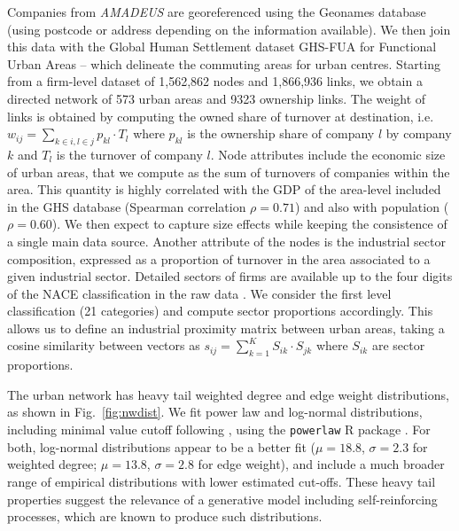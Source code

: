 \documentclass[10pt,letterpaper]{article}
\begin{document}
Companies from \emph{AMADEUS} are georeferenced using the Geonames database (using postcode or address depending on the information available). We then join this data with the Global Human Settlement dataset GHS-FUA for Functional Urban Areas \cite{Florczyk2019ghs} -- which delineate the commuting areas for urban centres. Starting from a firm-level dataset of 1,562,862 nodes and 1,866,936 links, we obtain a directed network of 573 urban areas and 9323 ownership links. The weight of links is obtained by computing the owned share of turnover at destination, i.e. $w_{ij} = \sum_{k \in i,l \in j} p_{kl} \cdot T_l$ where $p_{kl}$ is the ownership share of company $l$ by company $k$ and $T_l$ is the turnover of company $l$. Node attributes include the economic size of urban areas, that we compute as the sum of turnovers of companies within the area. This quantity is highly correlated with the GDP of the area-level included in the GHS database (Spearman correlation $\rho = 0.71$) and also with population ($\rho = 0.60$). We then expect to capture size effects while keeping the consistence of a single main data source. Another attribute of the nodes is the industrial sector composition, expressed as a proportion of turnover in the area associated to a given industrial sector. Detailed sectors of firms are available up to the four digits of the NACE classification in the raw data \cite{EUROSTAT2008}. We consider the first level classification (21 categories) and compute sector proportions accordingly. This allows us to define an industrial proximity matrix between urban areas, taking a cosine similarity between vectors as $s_{ij} = \sum_{k=1}^{K} S_{ik}\cdot S_{jk}$ where $S_{ik}$ are sector proportions.


The urban network has heavy tail weighted degree and edge weight distributions, as shown in Fig.~\ref{fig:nwdist}. We fit power law and log-normal distributions, including minimal value cutoff following \cite{clauset2009power}, using the \texttt{powerlaw} R package \cite{powerlawpackage}. For both, log-normal distributions appear to be a better fit ($\mu=18.8$, $\sigma=2.3$ for weighted degree; $\mu=13.8$, $\sigma=2.8$ for edge weight), and include a much broader range of empirical distributions with lower estimated cut-offs. These heavy tail properties suggest the relevance of a generative model including self-reinforcing processes, which are known to produce such distributions.
\end{document}

